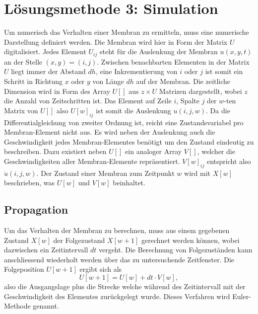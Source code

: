 %
%
%
\section{Lösungsmethode 3: Simulation 
	\label{kreismembran:section:teil4}}
%
Um numerisch das Verhalten einer Membran zu ermitteln, muss eine
numerische Darstellung definiert werden.
Die Membran wird hier in Form der Matrix $  U $ digitalisiert.
Jedes Element  $ U_{ij} $ steht für die Auslenkung der Membran $
u(x,y,t) $ an der Stelle $(x,y)=(i,j) $.
Zwischen benachbarten Elementen in der Matrix $ U $ liegt immer der
Abstand $ dh $, eine Inkrementierung von $ i $ oder $ j $ ist somit
ein Schritt in Richtung $ x $ oder $ y $ von Länge $ dh $ auf der
Membran.
Die zeitliche Dimension wird in Form des Array $  U[] $ aus $ z
\times U $ Matrizen dargestellt, wobei $ z $ die Anzahl von
Zeitschritten ist.
Das Element auf Zeile $ i $, Spalte $ j $ der $ w $-ten Matrix von $ U[] $ also $ U[w]_{ij} $ ist somit die Auslenkung $ u(i,j,w) $.
Da die Differentialgleichung von zweiter Ordnung ist, reicht eine Zustandsvariabel pro Membran-Element nicht aus. 
Es wird neben der Auslenkung auch die Geschwindigkeit jedes Membran-Elementes benötigt um den Zustand eindeutig zu beschreiben. 
Dazu existiert neben $ U[] $ ein analoger Array $ V[] $, welcher die
Geschwindigkeiten aller Membran-Elemente repräsentiert.
$ V[w]_{ij} $ entspricht also $ \dot{u}(i,j,w) $. 
Der Zustand einer Membran zum Zeitpunkt $ w $ wird mit $ X[w] $ beschrieben, was $ U[w] $ und $ V[w] $ beinhaltet.

\subsection{Propagation}
%
Um das Verhalten der Membran zu berechnen, muss aus einem gegebenen Zustand $ X[w] $ der Folgezustand $ X[w+1] $ gerechnet werden können, wobei dazwischen ein Zeitintervall $ dt $ vergeht. 
Die Berechnung von Folgezuständen kann anschliessend wiederholt werden über
das zu untersuchende Zeitfenster.
Die Folgeposition $ U[w+1] $ ergibt sich als 
\begin{equation}
	U[w+1] =  U[w] + dt \cdot V[w],
\end{equation} 
also die Ausgangslage plus die Strecke welche während des Zeitintervall
mit der Geschwindigkeit des Elementes zurückgelegt wurde.
Dieses Verfahren wird Euler-Methode genannt.
%

